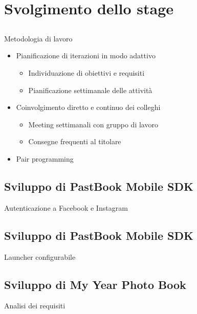 \section{Svolgimento dello stage}
	\subsection{}
		\begin{frame}{Metodologia di lavoro}
			\begin{itemize}
				\item Pianificazione di iterazioni in modo adattivo
				\begin{itemize}
					\item Individuazione di obiettivi e requisiti
					\item Pianificazione settimanale delle attività
				\end{itemize}
				\item Coinvolgimento diretto e continuo dei colleghi
				\begin{itemize}
					\item Meeting settimanali con gruppo di lavoro
					\item Consegne frequenti al titolare
				\end{itemize}
				\item Pair programming
			\end{itemize}
		\end{frame}
	\subsection{Sviluppo di PastBook Mobile SDK}
		\begin{frame}{Autenticazione a Facebook e Instagram}
			\fontsize{8pt}{7}\selectfont
			
		\end{frame}
	\subsection{Sviluppo di PastBook Mobile SDK}
		\begin{frame}{Launcher configurabile}
		\end{frame}
	\subsection{Sviluppo di My Year Photo Book}
		\begin{frame}{Analisi dei requisiti}
		\end{frame}
